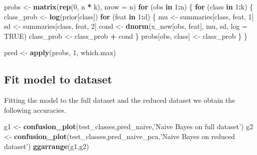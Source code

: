 \documentclass[]{article}
\newenvironment{Shaded}{\begin{snugshade}}{\end{snugshade}}
\newcommand{\KeywordTok}[1]{\textcolor[rgb]{0.13,0.29,0.53}{\textbf{#1}}}
\newcommand{\DataTypeTok}[1]{\textcolor[rgb]{0.13,0.29,0.53}{#1}}
\newcommand{\DecValTok}[1]{\textcolor[rgb]{0.00,0.00,0.81}{#1}}
\newcommand{\StringTok}[1]{\textcolor[rgb]{0.31,0.60,0.02}{#1}}
\newcommand{\OtherTok}[1]{\textcolor[rgb]{0.56,0.35,0.01}{#1}}
\newcommand{\ControlFlowTok}[1]{\textcolor[rgb]{0.13,0.29,0.53}{\textbf{#1}}}
\newcommand{\OperatorTok}[1]{\textcolor[rgb]{0.81,0.36,0.00}{\textbf{#1}}}
\newcommand{\NormalTok}[1]{#1}
\begin{document}
\begin{Shaded}
\begin{Highlighting}[]
\NormalTok{probs <-}\StringTok{ }\KeywordTok{matrix}\NormalTok{(}\KeywordTok{rep}\NormalTok{(}\DecValTok{0}\NormalTok{, n }\OperatorTok{*}\StringTok{ }\NormalTok{k), }\DataTypeTok{nrow =}\NormalTok{ n)}
\ControlFlowTok{for}\NormalTok{ (obs }\ControlFlowTok{in} \DecValTok{1}\OperatorTok{:}\NormalTok{n) \{}
  \ControlFlowTok{for}\NormalTok{ (class }\ControlFlowTok{in} \DecValTok{1}\OperatorTok{:}\NormalTok{k) \{}
\NormalTok{    class_prob <-}\StringTok{ }\KeywordTok{log}\NormalTok{(prior[class])}
    \ControlFlowTok{for}\NormalTok{ (feat }\ControlFlowTok{in} \DecValTok{1}\OperatorTok{:}\NormalTok{d) \{}
\NormalTok{      mu <-}\StringTok{ }\NormalTok{summaries[class, feat, }\DecValTok{1}\NormalTok{]}
\NormalTok{      sd <-}\StringTok{ }\NormalTok{summaries[class, feat, }\DecValTok{2}\NormalTok{]}
\NormalTok{      cond <-}\StringTok{ }\KeywordTok{dnorm}\NormalTok{(x_new[obs, feat], mu, sd, }\DataTypeTok{log =} \OtherTok{TRUE}\NormalTok{)}
\NormalTok{      class_prob <-}\StringTok{ }\NormalTok{class_prob }\OperatorTok{+}\StringTok{ }\NormalTok{cond}
\NormalTok{    \}}
\NormalTok{    probs[obs, class] <-}\StringTok{ }\NormalTok{class_prob}
\NormalTok{  \}}
\NormalTok{\}}

\NormalTok{pred <-}\StringTok{ }\KeywordTok{apply}\NormalTok{(probs, }\DecValTok{1}\NormalTok{, which.max)}
\end{Highlighting}
\end{Shaded}

\subsection{Fit model to dataset}\label{fit-model-to-dataset}

Fitting the model to the full dataset and the reduced dataset we obtain
the following accuracies.

\begin{Shaded}
\begin{Highlighting}[]
\NormalTok{g1 <-}\StringTok{ }\KeywordTok{confusion_plot}\NormalTok{(test_classes,pred_naive,}\StringTok{'Naive Bayes on full dataset'}\NormalTok{)}
\NormalTok{g2 <-}\StringTok{ }\KeywordTok{confusion_plot}\NormalTok{(test_classes,pred_naive_pca,}\StringTok{'Naive Bayes on reduced dataset'}\NormalTok{)}
\KeywordTok{ggarrange}\NormalTok{(g1,g2)}
\end{Highlighting}
\end{Shaded}
\end{document}
